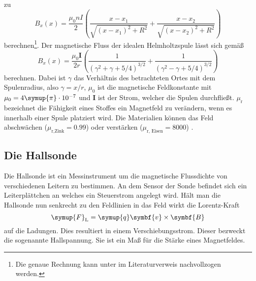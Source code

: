 zu
\begin{equation}
  B_x(x) = \frac{\mu_0 n I}{2} \left( \frac{x-x_1}{\sqrt{(x-x_1)^2+R^2}}
  + \frac{x-x_2}{\sqrt{(x-x_2)^2+R^2}} \right)
  \label{eqn:spuleGenau}
\end{equation}
berechnen\footnote{Die genaue Rechnung kann unter \cite{solenoid} im 
Literaturverweis nachvollzogen werden.}.
Der magnetische Fluss der idealen Helmholtzspule lässt sich gemäß
\begin{equation}
  B_x(x) = \frac{\mu_0 \symbf{I}}{2 r} \left( \frac{1}
  {(\gamma^2+\gamma+5/4)^{3/2}} + \frac{1}{(\gamma^2-\gamma+5/4)^{3/2}}
  \right)
  \label{eqn:helmholz}
\end{equation}
berechnen. Dabei ist $\gamma$ das Verhältnis des betrachteten Ortes mit dem
Spulenradius, also $\gamma = x / r$, $\mu_0$ ist die magnetische Feldkonstante
mit $\mu_0 = 4 \symup{\pi}\cdot\num{e-7}$ und $\symbf{I}$ ist der Strom,
welcher die Spulen durchfließt\cite{helm}. $\mu_\text{r}$ bezeichnet die
Fähigkeit eines Stoffes ein Magnetfeld zu verändern, wenn es innerhalb einer
Spule platziert wird. Die Materialien können das Feld abschwächen
($\mu_\text{r,Zink}=0.99$) oder verstärken ($\mu_\text{r, Eisen}=8000$)
\cite{muR}.

\subsection{Die Hallsonde}
Die Hallsonde ist ein Messinstrument um die magnetische Flussdichte von
verschiedenen Leitern zu bestimmen.
An dem Sensor der Sonde befindet sich ein Leiterplättchen an welches ein
Steuerstrom angelegt wird. Hält man die Hallsonde nun senkrecht zu den
Feldlinien in das Feld wirkt die Lorentz-Kraft
\begin{equation}
  \symup{F}_\text{L} = \symup{q} \symbf{v} \times \symbf{B}
\end{equation}
auf die Ladungen. Dies resultiert in einem Verschiebungsstrom. Dieser bezweckt
die sogenannte Hallspannung. Sie ist ein Maß für die Stärke eines Magnetfeldes.

